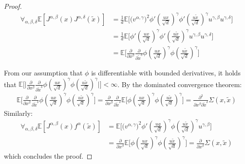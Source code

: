 \documentclass{article}
\theoremstyle{definition}
\theoremstyle{remark}
\renewcommand{\[}{\begin{eqnarray}}
\renewcommand{\]}{\end{eqnarray}}
\renewcommand{\[}{\begin{eqnarray}}
\renewcommand{\]}{\end{eqnarray}}
\newcommand{\E}{\mathbb{E}}
\begin{document}
\begin{proof}
\begin{align}
\forall_{\alpha,\beta, \delta}\E[J^{\alpha,\beta}(x)J^{\alpha,\delta}(\tilde{x})] &= \frac{1}{d}\E\Big[ \big(v^{\alpha,\gamma}\big)^2\phi'(\frac{ux}{\sqrt{d}})^\gamma \phi'(\frac{u\tilde{x}}{\sqrt{d}})^\gamma u^{\gamma,\beta}u^{\gamma,\delta}\Big]\\
&= \frac{1}{d}\E\Big[ \phi'(\frac{ux}{\sqrt{d}})^\gamma \phi'(\frac{u\tilde{x}}{\sqrt{d}})^\gamma u^{\gamma,\beta}u^{\gamma,\delta}\Big]\\
&= \E\Big[ \frac{\partial}{\partial x^\beta}\frac{\partial}{\partial \tilde{x}^\delta}\phi(\frac{ux}{\sqrt{d}})^\gamma \phi(\frac{u\tilde{x}}{\sqrt{d}})^\gamma \Big]
\end{align}

From our assumption that $\phi$ is differentiable with bounded derivatives, it holds that $\E\Big[ \big|\frac{\partial}{\partial x^\beta}\frac{\partial}{\partial \tilde{x}^\delta}\phi(\frac{ux}{\sqrt{d}})^\gamma \phi(\frac{u\tilde{x}}{\sqrt{d}})^\gamma \big|\Big] < \infty$. 
By the dominated convergence theorem:
\[
\E\Big[ \frac{\partial}{\partial x^\beta}\frac{\partial}{\partial \tilde{x}^\delta}\phi(\frac{ux}{\sqrt{d}})^\gamma \phi(\frac{u\tilde{x}}{\sqrt{d}})^\gamma \Big] = \frac{\partial}{\partial x^\beta}\frac{\partial}{\partial \tilde{x}^\delta}\E\Big[ \phi(\frac{ux}{\sqrt{d}})^\gamma \phi(\frac{u\tilde{x}}{\sqrt{d}})^\gamma \Big] = \frac{\partial^2}{\partial x^\beta \partial \tilde{x}^\delta}\Sigma(x,\tilde{x})
\]
Similarly:
\begin{align}
\forall_{\alpha,\beta, \delta}\E[J^{\alpha,\beta}(x)f^\alpha(\tilde{x})] &= \E\Big[\big(v^{\alpha,\gamma}\big)^2\phi'(\frac{ug}{\sqrt{d}})^\gamma \phi(\frac{u\tilde{x}}{\sqrt{d}})^\gamma u^{\gamma,\beta}\Big]\\
&= \frac{\partial}{\partial x^\beta}\E\Big[\phi(\frac{ux}{\sqrt{d}})^\gamma \phi(\frac{u\tilde{x}}{\sqrt{d}})^\gamma \Big] = \frac{\partial}{\partial x^\beta}\Sigma(x,\tilde{x})
\end{align}
which concludes the proof.
\end{proof}
\end{document}
